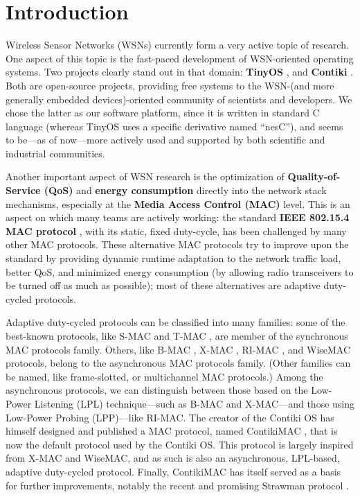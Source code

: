 \documentclass[12pt,twoside,a4paper]{article}
\begin{document}
\newcommand{\term}[1]{\textbf{#1}}

\makeRR



\section{Introduction}

Wireless Sensor Networks (WSNs) currently form a very active topic of
research. One aspect of this topic is the fast-paced development of
WSN-oriented operating systems.
Two projects clearly stand out in that domain: \term{TinyOS} \cite{tiny-os},
and \term{Contiki} \cite{contiki} \cite{contiki-web-site}.
Both are open-source projects, providing free\footnotemark{}
systems to the WSN-(and more generally embedded devices)-oriented community
of scientists and developers. We chose the latter as our software platform,
since it is written in standard C language (whereas TinyOS uses a specific
derivative named ``nesC''), and seems to be---as of now---more actively
used and supported by both scientific and industrial communities.


Another important aspect of WSN research is the optimization of
\term{Quality-of-Service (QoS)} and \term{energy consumption} directly into
the network stack mechanisms, especially at the \term{Media Access Control
(MAC)} level. This is an aspect on which many teams are actively working:
the standard \term{IEEE 802.15.4 MAC protocol} \cite{std802154}, with its
static, fixed duty-cycle, has been challenged by many other MAC protocols.
These alternative MAC protocols try to improve upon the standard by providing
dynamic runtime adaptation to the network traffic load, better QoS, and
minimized energy consumption (by allowing radio transceivers to be turned
off as much as possible); most of these alternatives are adaptive
duty-cycled protocols.

Adaptive duty-cycled protocols can be classified into many families:
some of the best-known protocols, like S-MAC \cite{s-mac} and
T-MAC \cite{t-mac}, are member of the synchronous MAC protocols family.
Others, like B-MAC \cite{b-mac}, X-MAC \cite{x-mac}, RI-MAC \cite{ri-mac},
and WiseMAC \cite{wise-mac} protocols, belong to the asynchronous MAC
protocols family. (Other families can be named, like frame-slotted,
or multichannel MAC protocols.) Among the asynchronous protocols,
we can distinguish between those based on the Low-Power Listening (LPL)
technique---such as B-MAC and X-MAC---and those using Low-Power
Probing (LPP)---like RI-MAC. The creator of the Contiki OS has himself
designed and published a MAC protocol, named ContikiMAC \cite{contiki-mac},
that is now the default protocol used by the Contiki OS. This protocol
is largely inspired from X-MAC and WiseMAC, and as such is also
an asynchronous, LPL-based, adaptive duty-cycled protocol.
Finally, ContikiMAC has itself served as a basis for further
improvements, notably the recent and promising
Strawman protocol \cite{strawman-mac}.
\end{document}
